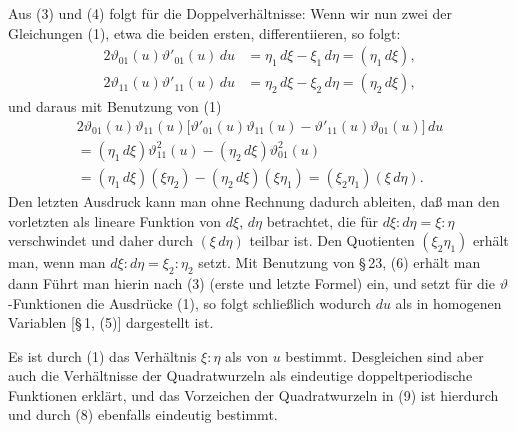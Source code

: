 
Aus (3) und (4) folgt für die Doppelverhältnisse:
Wenn wir nun zwei der Gleichungen (1), etwa die beiden ersten,
differentiieren, so folgt:
\[
\begin{aligned}
2\vartheta_{01}(u)\vartheta'_{01}(u)\,du &= \eta_1\,d\xi - \xi_1\,d\eta = (\eta_1\,d\xi),\\
2\vartheta_{11}(u)\vartheta'_{11}(u)\,du &= \eta_2\,d\xi - \xi_2\,d\eta = (\eta_2\,d\xi),
\end{aligned}
\]
und daraus mit Benutzung von (1)
\[
\begin{aligned}
2\vartheta_{01}(u)\vartheta_{11}(u)\bigl[\vartheta'_{01}(u)\vartheta_{11}(u) - \vartheta'_{11}(u)\vartheta_{01}(u)\bigr]\,du \\
= (\eta_1\,d\xi)\vartheta^2_{11}(u) - (\eta_2\,d\xi)\vartheta^2_{01}(u) \\
= (\eta_1\,d\xi)(\xi\eta_2) - (\eta_2\,d\xi)(\xi\eta_1) = (\xi_2\eta_1)(\xi\,d\eta).
\end{aligned}
\]
Den letzten Ausdruck kann man ohne Rechnung dadurch ableiten, daß man
den vorletzten als lineare Funktion von \(d\xi\), \(d\eta\) betrachtet, die für
\(d\xi : d\eta = \xi : \eta\) verschwindet und daher durch \((\xi\,d\eta)\) teilbar ist. Den
Quotienten \((\xi_2\eta_1)\) erhält man, wenn man \(d\xi : d\eta = \xi_2 : \eta_2\) setzt. Mit
Benutzung von \S\,23, (6) erhält man dann
Führt man hierin nach (3) (erste und letzte Formel)
ein, und setzt für die \(\vartheta\)-Funktionen die Ausdrücke (1), so folgt
schließlich
wodurch \(du\) als  in homogenen
Variablen [\S\,1, (5)] dargestellt ist.

Es ist durch (1) das Verhältnis \(\xi : \eta\) als 
von \(u\) bestimmt. Desgleichen sind aber auch die Verhältnisse der
Quadratwurzeln
als eindeutige doppeltperiodische Funktionen erklärt, und das Vorzeichen
der Quadratwurzeln in (9) ist hierdurch und durch (8) ebenfalls eindeutig
bestimmt.
